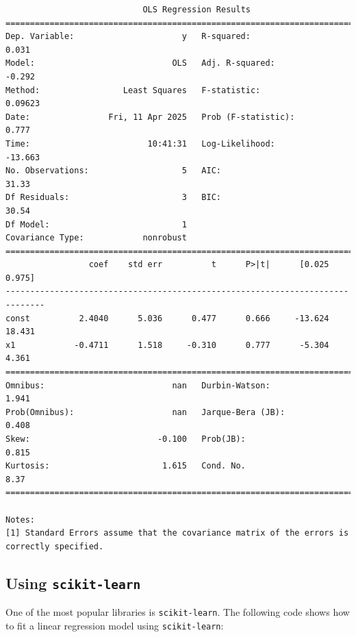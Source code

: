 \documentclass[
  letterpaper,
  DIV=11,
  numbers=noendperiod]{scrreprt}
\begin{document}
\begin{verbatim}
                            OLS Regression Results                            
==============================================================================
Dep. Variable:                      y   R-squared:                       0.031
Model:                            OLS   Adj. R-squared:                 -0.292
Method:                 Least Squares   F-statistic:                   0.09623
Date:                Fri, 11 Apr 2025   Prob (F-statistic):              0.777
Time:                        10:41:31   Log-Likelihood:                -13.663
No. Observations:                   5   AIC:                             31.33
Df Residuals:                       3   BIC:                             30.54
Df Model:                           1                                         
Covariance Type:            nonrobust                                         
==============================================================================
                 coef    std err          t      P>|t|      [0.025      0.975]
------------------------------------------------------------------------------
const          2.4040      5.036      0.477      0.666     -13.624      18.431
x1            -0.4711      1.518     -0.310      0.777      -5.304       4.361
==============================================================================
Omnibus:                          nan   Durbin-Watson:                   1.941
Prob(Omnibus):                    nan   Jarque-Bera (JB):                0.408
Skew:                          -0.100   Prob(JB):                        0.815
Kurtosis:                       1.615   Cond. No.                         8.37
==============================================================================

Notes:
[1] Standard Errors assume that the covariance matrix of the errors is correctly specified.
\end{verbatim}

\subsection*{\texorpdfstring{Using
\texttt{scikit-learn}}{Using scikit-learn}}\label{using-scikit-learn}

One of the most popular libraries is \texttt{scikit-learn}. The
following code shows how to fit a linear regression model using
\texttt{scikit-learn}:
\end{document}
